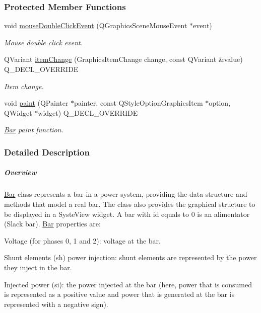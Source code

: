 \subsubsection*{Protected Member Functions}
\begin{DoxyCompactItemize}
\item 
void \hyperlink{group___models_ga1945e7b4401fa9ad7475274d9fb12a72}{mouse\+Double\+Click\+Event} (Q\+Graphics\+Scene\+Mouse\+Event $\ast$event)
\begin{DoxyCompactList}\small\item\em Mouse double click event. \end{DoxyCompactList}\item 
Q\+Variant \hyperlink{group___models_gad97a82d618ee0c51a9a36e44339c69e6}{item\+Change} (Graphics\+Item\+Change change, const Q\+Variant \&value) Q\+\_\+\+D\+E\+C\+L\+\_\+\+O\+V\+E\+R\+R\+I\+D\+E
\begin{DoxyCompactList}\small\item\em Item change. \end{DoxyCompactList}\item 
void \hyperlink{group___models_gacbb6dbac607412c9c1f9dfcd0cd4d432}{paint} (Q\+Painter $\ast$painter, const Q\+Style\+Option\+Graphics\+Item $\ast$option, Q\+Widget $\ast$widget) Q\+\_\+\+D\+E\+C\+L\+\_\+\+O\+V\+E\+R\+R\+I\+D\+E
\begin{DoxyCompactList}\small\item\em \hyperlink{class_bar}{Bar} paint function. \end{DoxyCompactList}\end{DoxyCompactItemize}


\subsubsection{Detailed Description}
\subparagraph*{Overview}

\hyperlink{class_bar}{Bar} class represents a bar in a power system, providing the data structure and methods that model a real bar. The class also provides the graphical structure to be displayed in a Syste\+View widget. A bar with id equals to 0 is an alimentator (Slack bar). \hyperlink{class_bar}{Bar} properties are\+:
\begin{DoxyItemize}
\item Voltage (for phases 0, 1 and 2)\+: voltage at the bar.
\item Shunt elements (sh) power injection\+: shunt elements are represented by the power they inject in the bar.
\item Injected power (si)\+: the power injected at the bar (here, power that is consumed is represented as a positive value and power that is generated at the bar is represented with a negative sign).
\end{DoxyItemize}

